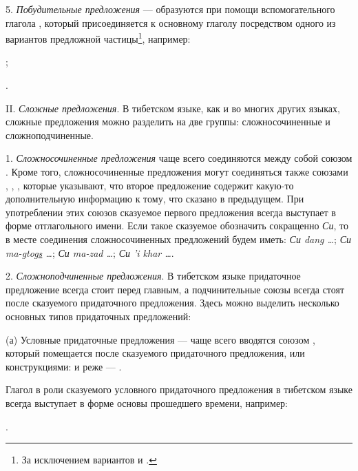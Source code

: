 5. \emph{Побудительные предложения} --- образуются при помощи вспомогательного глагола , который присоединяется к основному глаголу посредством одного из вариантов предложной частицы\footnote[53]{За исключением вариантов  и .}, например:
\begin{prfsample}
	\item {};
	\item {}.
\end{prfsample}

II. \emph{Сложные предложения}. В тибетском языке, как и во многих других языках, сложные предложения можно разделить на две группы: сложносочиненные и сложноподчиненные.

1. \emph{Сложносочиненные предложения} чаще всего соединяются между собой союзом . Кроме того, сложносочиненные предложения могут соединяться также союзами , , , которые указывают, что второе предложение содержит какую-то дополнительную информацию к тому, что сказано в предыдущем. При употреблении этих союзов сказуемое первого предложения всегда выступает в форме отглагольного имени. Если такое сказуемое обозначить сокращенно \emph{Си}, то в месте соединения сложносочиненных предложений будем иметь: \emph{Си dang \ldots{}}; \emph{Си ma-\ul{g}tog\ul{s} \ldots{}}; \emph{Си ma-zad \ldots{}}; \emph{Си 'i khar \ldots{}}.

2. \emph{Сложноподчиненные предложения}. В тибетском языке придаточное предложение всегда стоит перед главным, а подчинительные союзы всегда стоят после сказуемого придаточного предложения. Здесь можно выделить несколько основных типов придаточных предложений:

(а)	Условные придаточные предложения --- чаще всего вводятся союзом , который помещается после сказуемого придаточного предложения, или конструкциями:
 и реже --- .

Глагол в роли сказуемого условного придаточного предложения в тибетском языке всегда выступает в форме основы прошедшего времени, например:
\begin{prfsample}
	\item {}.
\end{prfsample}


